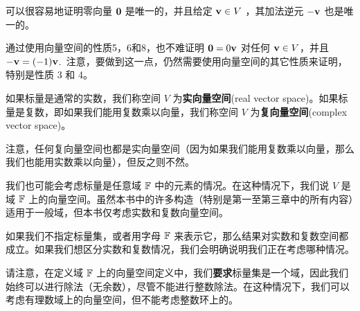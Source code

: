\begin{remark*}
可以很容易地证明零向量 $\mathbf{0}$ 是唯一的，并且给定 $\mathbf{v} \in V$ ，其加法逆元 $-\mathbf{v}$ 也是唯一的。
\end{remark*}

通过使用向量空间的性质5，6和8，也不难证明 $\mathbf{0} = 0 \mathbf{v}$ 对任何 $\mathbf{v} \in V$，并且 $-\mathbf{v} = (-1)\mathbf{v}$.~注意，要做到这一点，仍然需要使用向量空间的其它性质来证明，特别是性质 3 和 4。


如果标量是通常的实数，我们称空间 $V$ 为\textbf{实向量空间}(real vector space)。如果标量是复数，即如果我们能用复数乘以向量，我们称空间 $V$ 为\textbf{复向量空间}(complex vector space)。

注意，任何复向量空间也都是实向量空间（因为如果我们能用复数乘以向量，那么我们也能用实数乘以向量），但反之则不然。

我们也可能会考虑标量是任意域 $\mathbb{F}$ 中的元素的情况。在这种情况下，我们说 $V$ 是域 $\mathbb{F}$ 上的向量空间。虽然本书中的许多构造（特别是第一至第三章中的所有内容）适用于一般域，但本书仅考虑实数和复数向量空间。

如果我们不指定标量集，或者用字母 $\mathbb{F}$ 来表示它，那么结果对实数和复数空间都成立。如果我们想区分实数和复数情况，我们会明确说明我们正在考虑哪种情况。

请注意，在定义域 $\mathbb{F}$ 上的向量空间定义中，我们\textbf{要求}标量集是一个域，因此我们始终可以进行除法（无余数），尽管不能进行整数除法。在这种情况下，我们可以考虑有理数域上的向量空间，但不能考虑整数环上的。






